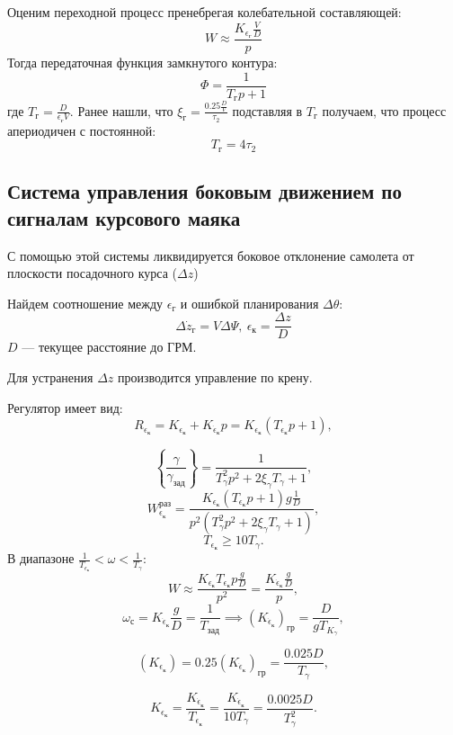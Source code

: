 \documentclass{article}
\begin{document}
Оценим переходной процесс пренебрегая колебательной составляющей:
\[
	W \approx \frac{K_{\epsilon_\text{г}} \frac{V}{D}}{p}
\]
Тогда передаточная функция замкнутого контура:
\[
	\Phi = \frac{1}{T_\text{г} p + 1}
\]
где $T_\text{г} = \frac{D}{\epsilon_\text{г} V}$.
Ранее нашли, что $\xi_\text{г} = \frac{0.25 \frac{D}{V}}{\tau_2}$ подставляя в
$T_\text{г}$ получаем, что процесс апериодичен с постоянной:
\[
	T_\text{г} = 4 \tau_2
\]

\subsection{Система управления боковым движением по сигналам курсового маяка}
С помощью этой системы ликвидируется боковое отклонение самолета от плоскости
посадочного курса ($\Delta z$)
\begin{figure}[H]
	\centering
	\label{fig:fig_71}
\end{figure}
Найдем соотношение между $\epsilon_\text{г}$ и ошибкой планирования $\Delta
	\theta$:
\[
	\Delta \dot{z}_\text{г} = V \Delta \Psi, \ \epsilon_\text{к} = \frac{\Delta
		z}{D}
\]
$D$ --- текущее расстояние до ГРМ.

Для устранения $\Delta z$ производится управление по крену.
\begin{figure}[H]
	\centering
	\label{fig:fig_72}
\end{figure}
Регулятор имеет вид:
\[
	R_{\epsilon_\text{к}} = K_{\epsilon_\text{к}} +
	K_{\dot{\epsilon}_{\text{к}}} p =
	K_{\epsilon_\text{к}}(T_{\epsilon_\text{к}} p + 1),
\]

\[
	\left\{ \frac{\gamma}{\gamma_\text{зад}} \right\} = \frac{1}{ T_\gamma^2
		p^2 + 2 \xi_\gamma T_\gamma + 1},
\]
\[
	W_{\epsilon_\text{к}}^\text{раз} = \frac{K_{\epsilon_\text{к}}
		(T_{\epsilon_\text{к}} p + 1) g \frac{1}{D}}{ p^2 ( T_\gamma^2 p^2 + 2
		\xi_\gamma T_\gamma + 1)},
\]
\[
	T_{\epsilon_\text{к}} \ge 10 T_\gamma.
\]
В диапазоне $\frac{1}{T_{\epsilon_\text{к}}} < \omega < \frac{1}{T_\gamma}$:
\[
	W \approx \frac{K_{\epsilon_\text{к}} T_{\epsilon_\text{к}} p
		\frac{g}{D}}{p^2} = \frac{K_{\dot{\epsilon}_{\text{к}}} \frac{g}{D}}{p},
\]
\[
	\omega_{\text{с}} = K_{\dot{\epsilon}_{\text{к}}} \frac{g}{D} =
	\frac{1}{T_{\text{зад}}} \implies
	(K_{\dot{\epsilon}_{\text{к}}})_{\text{гр}} = \frac{D}{g T_{K_{\gamma}}} ,
\]

\[
	(K_{\epsilon_\text{к}}) = 0.25 (K_{\dot{\epsilon}_{\text{к}}})_{\text{гр}}
	= \frac{0.025 D}{T_{\gamma}},
\]

\[
	K_{\epsilon_\text{к}} =
	\frac{K_{\dot{\epsilon}_{\text{к}}}}{T_{\epsilon_\text{к}}} =
	\frac{K_{\dot{\epsilon}_{\text{к}}}}{10 T_\gamma} = \frac{0.0025
		D}{T_\gamma^2}.
\]
\end{document}
